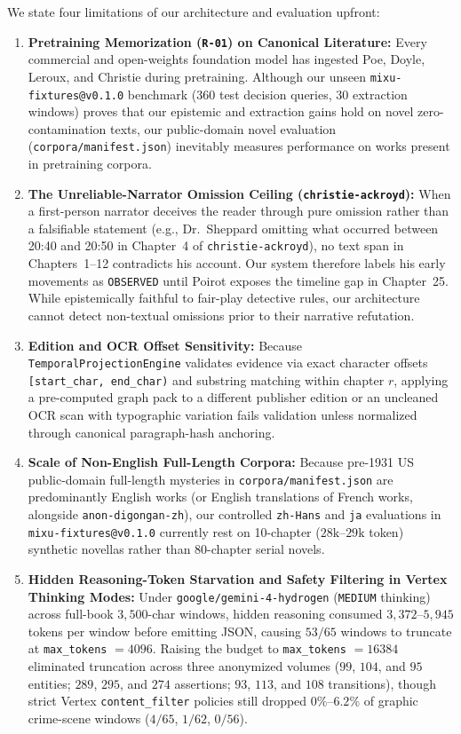 \documentclass[11pt,twocolumn]{article}
\begin{document}
We state four limitations of our architecture and evaluation upfront:
\begin{enumerate}
  \item \textbf{Pretraining Memorization (\texttt{R-01}) on Canonical Literature:} Every commercial and open-weights foundation model has ingested Poe, Doyle, Leroux, and Christie during pretraining. Although our unseen \texttt{mixu-fixtures@v0.1.0} benchmark ($360$ test decision queries, $30$ extraction windows) proves that our epistemic and extraction gains hold on novel zero-contamination texts, our public-domain novel evaluation (\texttt{corpora/manifest.json}) inevitably measures performance on works present in pretraining corpora.
  \item \textbf{The Unreliable-Narrator Omission Ceiling (\texttt{christie-ackroyd}):} When a first-person narrator deceives the reader through pure omission rather than a falsifiable statement (e.g., Dr.\ Sheppard omitting what occurred between 20:40 and 20:50 in Chapter~4 of \texttt{christie-ackroyd}), no text span in Chapters~1--12 contradicts his account. Our system therefore labels his early movements as \texttt{OBSERVED} until Poirot exposes the timeline gap in Chapter~25. While epistemically faithful to fair-play detective rules, our architecture cannot detect non-textual omissions prior to their narrative refutation.
  \item \textbf{Edition and OCR Offset Sensitivity:} Because \texttt{TemporalProjectionEngine} validates evidence via exact character offsets \texttt{[start\_char, end\_char)} and substring matching within chapter $r$, applying a pre-computed graph pack to a different publisher edition or an uncleaned OCR scan with typographic variation fails validation unless normalized through canonical paragraph-hash anchoring.
  \item \textbf{Scale of Non-English Full-Length Corpora:} Because pre-1931 US public-domain full-length mysteries in \texttt{corpora/manifest.json} are predominantly English works (or English translations of French works, alongside \texttt{anon-digongan-zh}), our controlled \texttt{zh-Hans} and \texttt{ja} evaluations in \texttt{mixu-fixtures@v0.1.0} currently rest on 10-chapter ($28\text{k--}29\text{k}$ token) synthetic novellas rather than 80-chapter serial novels.
  \item \textbf{Hidden Reasoning-Token Starvation and Safety Filtering in Vertex Thinking Modes:} Under \texttt{google/gemini-4-hydrogen} (\texttt{MEDIUM} thinking) across full-book $3{,}500$-char windows, hidden reasoning consumed $3{,}372\text{--}5{,}945$ tokens per window before emitting JSON, causing $53/65$ windows to truncate at \texttt{max\_tokens} $= 4096$. Raising the budget to \texttt{max\_tokens} $= 16384$ eliminated truncation across three anonymized volumes ($99$, $104$, and $95$ entities; $289$, $295$, and $274$ assertions; $93$, $113$, and $108$ transitions), though strict Vertex \texttt{content\_filter} policies still dropped $0\%\text{--}6.2\%$ of graphic crime-scene windows ($4/65$, $1/62$, $0/56$).
\end{enumerate}
\end{document}
